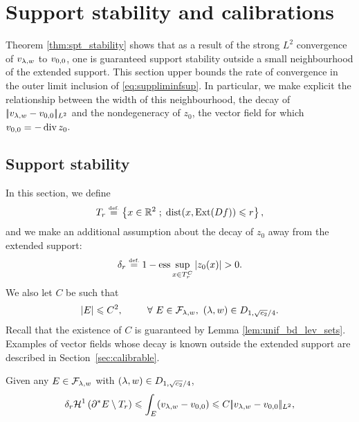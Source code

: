 

\section{Support stability and calibrations}\label{sec:stab_grad}
Theorem \ref{thm:spt_stability} shows that as a result of the strong $L^2$ convergence of $v_{\lambda,w}$ to $v_{0,0}$, one is guaranteed support stability outside a small neighbourhood of the extended support. This section upper bounds the rate of convergence in the outer limit inclusion of \eqref{eq:suppliminfsup}. In particular, we make explicit the relationship between the width of this neighbourhood, the decay of $|\!| v_{\lambda,w}-v_{0,0} |\!|_{L^2}$ and the nondegeneracy of $z_0$, the vector field for which $v_{0,0} = -\operatorname{div} z_0$. 


\subsection{Support stability}
In this section, we define 
\begin{equation*}
T_r \stackrel{\mbox{\upshape\tiny def.}}{=}  \left\{ x\in \mathbb{R}^2 \;;\; \mathrm{dist}(x,\operatorname{Ext}(Df))\leqslant r  \right\},
\end{equation*}
and we make an additional assumption about the decay of $z_0$ away from the extended support: 
\begin{equation}
  \deltar\eqdef 1-\ess \sup_{x\in T_r^C} \abs{z_0(x)}>0.\label{eq:defer}
\end{equation}
We also let $C$ be such that
$$
\left| E \right|\leqslant C^2, \hspace*{25pt} \forall~E\in\mathcal{F}_{\lambda,w}, ~ (\lambda,w)\in D_{1,\sqrt{c_2}/4}.
$$
Recall that the existence of $ C$ is guaranteed by Lemma \ref{lem:unif_bd_lev_sets}.
Examples of  vector fields whose decay is known outside the extended support are described in Section~\ref{sec:calibrable}.




\begin{prop}\label{prop:partoutsidetube}
 Given any $E\in \mathcal{F}_{\lambda,w}$ with $(\lambda,w)\in D_{1,\sqrt{c_2}/4}$,
\begin{equation*}
  \delta_r \mathcal{H}^{1}\left({\partial^*E\setminus T_r}\right)\leqslant \int_{E}(v_{\lambda,w} - v_{0,0})\leqslant C|\!| v_{\lambda,w}-v_{0,0} |\!|_{L^2},
\end{equation*}
\end{prop}


